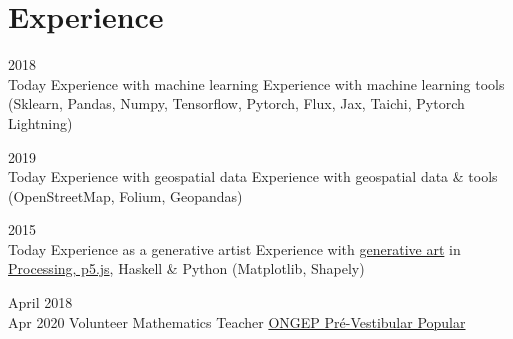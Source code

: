 \documentclass[letterpaper]{twentysecondcv} %
\begin{document}

\vspace{-2em}
\section{Experience}

\begin{twenty} %

        \twentyitem
    	{2018 \\ Today}
        {Experience with machine learning}
        {}
        {}
        {
            Experience with machine learning tools (Sklearn, Pandas, Numpy, Tensorflow, Pytorch, Flux, Jax, Taichi, Pytorch Lightning)
        }
        
        \twentyitem
    	{2019 \\ Today}
        {Experience with geospatial data}
        {}
        {}
        {
            Experience with geospatial data \& tools (OpenStreetMap, Folium, Geopandas)
        }
        
        \twentyitem
    	{2015 \\ Today}
        {Experience as a generative artist}
        {}
        {}
        {
            Experience with {\color{pblue} \href{https://marceloprates.github.io}{generative art}} in {\color{pblue} \href{https://www.openprocessing.org/user/45135}{Processing, p5.js}}, Haskell \& Python (Matplotlib, Shapely)
        }

	    \twentyitem
    	{April 2018 \\ Apr 2020}
        {Volunteer Mathematics Teacher}
        {\href{http://www.ongep.org/}{ONGEP Pré-Vestibular Popular}}
        {}
        {}
        
\end{twenty}

\cleardoublepage
\end{document}
